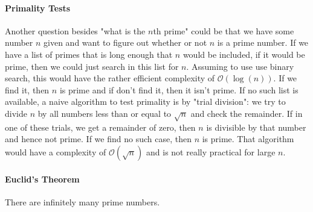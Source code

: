 \paragraph{Primality Tests}
Another question besides "what is the $n$th prime" could be that we have some number $n$ given and want to figure out whether or not $n$ is a prime number. If we have a list of primes that is long enough that $n$ would be included, if it would be prime, then we could just search in this list for $n$. Assuming to use use binary search, this would have the rather efficient complexity of $\mathcal{O}(\log(n))$. If we find it, then $n$ is prime and if don't find it, then it isn't prime. If no such list is available, a naive algorithm to test primality is by "trial division": we try to divide $n$ by all numbers less than or equal to $\sqrt{n}$ and check the remainder. If in one of these trials, we get a remainder of zero, then $n$ is divisible by that number and hence not prime. If we find no such case, then $n$ is prime. That algorithm would have a complexity of $\mathcal{O}(\sqrt{n})$ and is not really practical for large $n$.






\paragraph{Euclid's Theorem} There are infinitely many prime numbers.



